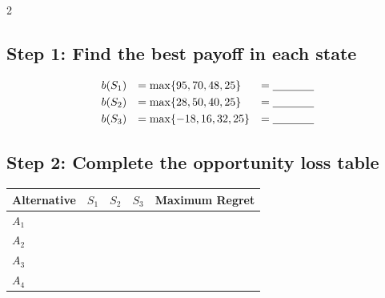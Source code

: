 \begin{multicols}{2}
	\subsection*{Step 1: Find the best payoff in each state}
	
	\[
	\begin{array}{lll}
		b(S_1) &= \max\{95,70,48,25\} &= \underline{\hspace{1.3cm}} \\[3pt]
		b(S_2) &= \max\{28,50,40,25\} &= \underline{\hspace{1.3cm}} \\[3pt]
		b(S_3) &= \max\{-18,16,32,25\} &= \underline{\hspace{1.3cm}}
	\end{array}
	\]
	
	\subsection*{Step 2: Complete the opportunity loss table}
	
	\begin{center}
		\renewcommand{\arraystretch}{1.5}
		\small
		\begin{tabular}{lcccc}
			\toprule
			Alternative & $S_1$ & $S_2$ & $S_3$ & Maximum Regret \\
			\midrule
			$A_1$ &
			\underline{\hspace{1.1cm}} &
			\underline{\hspace{1.1cm}} &
			\underline{\hspace{1.1cm}} &
			\underline{\hspace{1.1cm}} \\[3pt]
			
			$A_2$ &
			\underline{\hspace{1.1cm}} &
			\underline{\hspace{1.1cm}} &
			\underline{\hspace{1.1cm}} &
			\underline{\hspace{1.1cm}} \\[3pt]
			
			$A_3$ &
			\underline{\hspace{1.1cm}} &
			\underline{\hspace{1.1cm}} &
			\underline{\hspace{1.1cm}} &
			\underline{\hspace{1.1cm}} \\[3pt]
			
			$A_4$ &
			\underline{\hspace{1.1cm}} &
			\underline{\hspace{1.1cm}} &
			\underline{\hspace{1.1cm}} &
			\underline{\hspace{1.1cm}} \\
			\bottomrule
		\end{tabular}
	\end{center}
	

\end{multicols}

